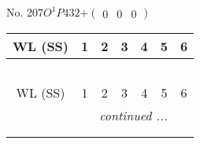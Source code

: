 \documentclass[fleqn,9pt,landscape]{jsarticle}
\begin{document}
\newpage
No. 207\quad$O_{}^{1}$\quad$P432$\quad[ cubic ]\quad$+\begin{pmatrix} 0 & 0 & 0 \end{pmatrix}$
\begin{center}
\renewcommand{\arraystretch}{1.2}
\begin{longtable}{ccccccc}
 \hline \hline
WL (SS) & 1 & 2 & 3 & 4 & 5 & 6 \\ \hline \endfirsthead

\multicolumn{6}{l}{\tablename\ \thetable{}} \\
 \hline \hline
WL (SS) & 1 & 2 & 3 & 4 & 5 & 6 \\ \hline \endhead

 \hline \hline
\multicolumn{6}{r}{\footnotesize\it continued ...} \\ \endfoot

 \hline \hline
\multicolumn{6}{r}{} \\ \endlastfoot


\end{longtable}
\end{center}
\end{document}
